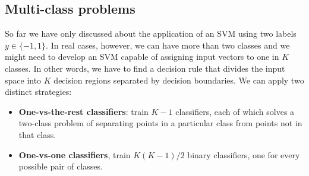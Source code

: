 \subsection{Multi-class problems}
So far we have only discussed about the application of an SVM using two labels $y \in\{-1,1\}$. In real cases, however, we can have more than two classes and we might need to develop an SVM capable of assigning input vectors to one in $K$ classes. In other words, we have to find a decision rule that divides the input space into $K$ decision regions separated by decision boundaries. 
We can apply two distinct strategies:
\begin{itemize}
	\item \textbf{One-vs-the-rest classifiers}: train $K-1$ classifiers, each of which solves a two-class problem of separating points in a particular class from points not in that class.
	
	\item \textbf{One-vs-one classifiers}, train $K(K-1)/2$ binary classifiers, one for every possible pair of classes.
	
\end{itemize}

